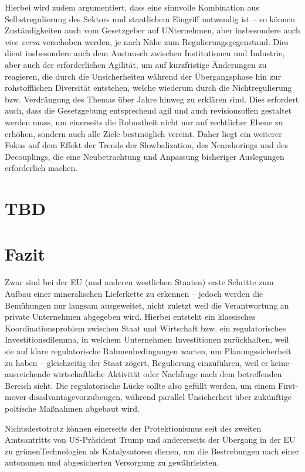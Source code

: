 \documentclass[12pt,a4paper,oneside]{book} %
\begin{document}
Hierbei wird zudem argumentiert, dass eine sinnvolle Kombination aus Selbstregulierung des Sektors und staatlichem Eingriff notwendig ist -- so können Zuständigkeiten auch vom Gesetzgeber auf UNternehmen, aber insbesondere auch \textit{vice versa} verschoben werden, je nach Nähe zum Regulierungsgegenstand. Dies dient insbesondere auch dem Austausch zwischen Institutionen und Industrie, aber auch der erforderlichen Agilität, um auf kurzfristige Änderungen zu reagieren, die durch die Unsicherheiten während der Übergangsphase hin zur rohstofflichen Diversität entstehen, welche wiederum durch die Nichtregulierung bzw. Verdrängung des Themas über Jahre hinweg zu erklären sind. Dies erfordert auch, dass die Gesetzgebung entsprechend agil und auch revisionsoffen gestaltet werden muss, um einerseits die Robustheit nicht nur auf rechtlicher Ebene zu erhöhen, sondern auch alle Ziele bestmöglich vereint. Daher liegt ein weiterer Fokus auf dem Effekt der Trends der Slowbalization, des Nearshorings und des Decouplings, die eine Neubetrachtung und Anpassung bisheriger Auslegungen erforderlich machen.

\section{TBD}

\section{Fazit}
Zwar sind bei der EU (und anderen westlichen Staaten) erste Schritte zum Aufbau einer mineralischen Lieferkette zu erkennen -- jedoch werden die Bemühungen nur langsam ausgeweitet, nicht zuletzt weil die Verantwortung an private Unternehmen abgegeben wird. Hierbei entsteht ein klassisches Koordinationsproblem zwischen Staat und Wirtschaft bzw. ein \glqq regulatorisches Investitionsdilemma\grqq, in welchem Unternehmen Investitionen zurückhalten, weil sie auf klare regulatorische Rahmenbedingungen warten, um Planungssicherheit zu haben -- gleichzeitig der Staat zögert, Regulierung einzuführen, weil er keine ausreichende wirtschaftliche Aktivität oder Nachfrage nach dem betreffenden Bereich sieht. Die regulatorische Lücke sollte also gefüllt werden, um einem \glqq First-mover disadvantage\grqq vorzubeugen, während parallel Unsicherheit über zukünftige poltische Maßnahmen abgebaut wird.

Nichtsdestotrotz können einerseits der Protektionismus seit des zweiten Amtsantritts von US-Präsident Trump und andererseits der Übergang in der EU zu \glqq grünen\grqq Technologien als Katalysatoren dienen, um die Bestrebungen nach einer autonomen und abgesicherten Versorgung zu gewährleisten.


\printbibliography 
\end{document}
